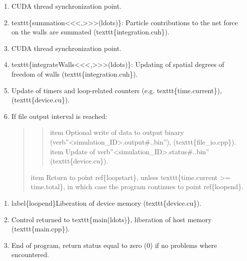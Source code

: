 \documentclass[letterpaper,10pt,english]{sphinxmanual}
\begin{document}
\begin{enumerate}
\item {} 
CUDA thread synchronization point.

\item {} 
texttt\{summation\textless{}\textless{}\textless{},\textgreater{}\textgreater{}\textgreater{}(ldots)\}: Particle contributions to the net force on the walls are summated (texttt\{integration.cuh\}).

\item {} 
CUDA thread synchronization point.

\item {} 
texttt\{integrateWalls\textless{}\textless{}\textless{},\textgreater{}\textgreater{}\textgreater{}(ldots)\}: Updating of spatial degrees of freedom of walls (texttt\{integration.cuh\}).

\item {} 
Update of timers and loop-related counters (e.g. texttt\{time.current\}), (texttt\{device.cu\}).

\item {} 
If file output interval is reached:
\begin{quote}
\begin{quote}

item Optional write of data to output binary (verb''\textless{}simulation\_ID\textgreater{}.output\#..bin''), (texttt\{file\_io.cpp\}).
item Update of verb''\textless{}simulation\_ID\textgreater{}.status\#..bin'' (texttt\{device.cu\}).
\end{quote}

item Return to point ref\{loopstart\}, unless texttt\{time.current \textgreater{}= time.total\}, in which case the program continues to point ref\{loopend\}.
\end{quote}

\end{enumerate}
\begin{enumerate}
\item {} 
label\{loopend\}Liberation of device memory (texttt\{device.cu\}).

\item {} 
Control returned to texttt\{main(ldots)\}, liberation of host memory (texttt\{main.cpp\}).

\item {} 
End of program, return status equal to zero (0) if no problems where encountered.

\end{enumerate}
\end{document}
